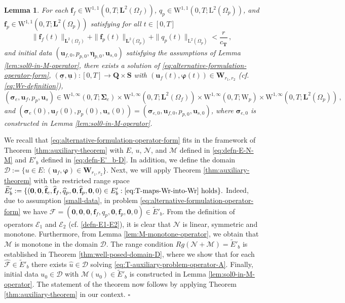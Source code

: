 \documentclass[11pt]{article}
\numberwithin{equation}{section}
\newcommand{\bbeta}{{\boldsymbol\eta}}
\newcommand{\bsi}{{\boldsymbol\sigma}}
\newcommand{\bSigma}{{\boldsymbol\Sigma}}
\newcommand{\bvarphi}{{\boldsymbol\varphi}}
\newcommand{\ubsi}{\underline{\bsi}}
\newcommand{\ubu}{\underline{\bu}}
\newcommand{\f}{\mathbf{f}}
\newcommand{\bu}{\mathbf{u}}
\newcommand{\0}{{\mathbf{0}}}
\def\bW{\mathbf{W}}
\def\bT{\mathbf{T}}
\def\bQ{\mathbf{Q}}
\def\bS{\mathbf{S}}
\newcommand{\bL}{\mathbf{L}}
\newcommand{\cE}{\mathcal{E}}
\newcommand{\cF}{\mathcal{F}}
\newcommand{\cN}{\mathcal{N}}
\newcommand{\cM}{\mathcal{M}}
\newcommand{\cD}{\mathcal{D}}
\def\L{\mathrm{L}}
\def\W{\mathrm{W}}
\def\wt{\widetilde}
\def\wh{\widehat}
\newtheorem{lem}[thm]{Lemma}
\newenvironment{proof}{\noindent{\it Proof.}}{\hfill$\square$}
\numberwithin{equation}{section}
\begin{document}
\begin{lem}\label{lem:parabolic-solution}
For each 
$\f_f\in \W^{1,1}(0,T;\bL^2(\Omega_f))$, $q_p\in \W^{1,1}(0,T;\L^2(\Omega_p))$, and $\f_p\in \W^{1,1}(0,T;\bL^2(\Omega_p))$ satisfying for all $t \in [0,T]$
%
\begin{equation}\label{small-data}
\|\f_f(t)\|_{\bL^2(\Omega_f)} + \|\f_p(t)\|_{\bL^2(\Omega_p)} + \|q_p(t)\|_{\L^2(\Omega_p)} 
< \frac{r}{c_\bT}\,,
\end{equation}
%
and initial data $(\bu_{f,0},p_{p,0},\bbeta_{p,0},\bu_{s,0})$
satisfying the assumptions of Lemma \ref{lem:sol0-in-M-operator}, there exists a solution of \eqref{eq:alternative-formulation-operator-form}, $(\ubsi,\ubu): [0,T] \to \bQ\times\bS$ with $(\bu_f(t),\bvarphi(t))\in \bW_{r_1,r_2}$ (cf. \eqref{eq:Wr-definition}),
%
\begin{equation*}
(\bsi_e, \bu_f, p_p,\bu_s)\in \W^{1,\infty}(0,T;\bSigma_e)\times \W^{1,\infty}(0,T;\bL^2(\Omega_f))\times \W^{1,\infty}(0,T;\W_p)\times\W^{1,\infty}(0,T; \bL^2(\Omega_p))\,,
\end{equation*}
%
and $(\bsi_e(0),\bu_f(0),p_p(0),\bu_s(0)) = (\bsi_{e,0},\bu_{f,0},p_{p,0},\bu_{s,0})$, where $\bsi_{e,0}$ is constructed in Lemma \ref{lem:sol0-in-M-operator}.
\end{lem}
%
\begin{proof}
We recall that \eqref{eq:alternative-formulation-operator-form} fits in the framework of Theorem \ref{thm:auxiliary-theorem} with $E$, $u$, $\cN$, and $\cM$ defined in \eqref{eq:defn-E-N-M} and $E'_b$ defined in \eqref{eq:defn-E'_b-D}. In addition, we define the domain 
%
$
\cD := \{u \in E: (\bu_f,\bvarphi) \in \bW_{r_1,r_2}\}.
$
%
Next, we will apply Theorem \ref{thm:auxiliary-theorem} with the restricted range space 
%
$
\wt{E}'_b := \{(\0,\0,\wh{\f}_e,\wh{\f}_f,\wh{q}_p,\0,\wh{\f}_p,\0,0) \in E'_b: \mbox{\eqref{eq:T-maps-Wr-into-Wr} holds}\}.
$
%
Indeed, due to assumption \eqref{small-data}, in problem \eqref{eq:alternative-formulation-operator-form} we have $\cF = (\0,\0,\0,\f_f,q_p,\0,\f_p,\0,0) \in \wt{E}'_b$. 
From the definition of operators $\cE_1$ and $\cE_2$ (cf. \eqref{defn-E1-E2}), it is clear that $\cN$ is linear, symmetric and monotone. 
Furthermore, from Lemma \ref{lem:M-monotone-operator}, we obtain that $\cM$ is monotone in the domain $\cD$. 
The range condition $Rg(\cN+\cM) = \wt{E}'_b$ is established in Theorem \ref{thm:well-posed-domain-D}, where we show that for each $\wh{\cF} \in \wt{E}'_b$ there exists $\wh{u}\in \cD$ solving \eqref{eq:T-auxiliary-problem-operator-A}. 
Finally, initial data $u_0 \in \cD$ with $\cM(u_0) \in \wt{E}'_b$ is constructed in Lemma \ref{lem:sol0-in-M-operator}. 
The statement of the theorem now follows by applying Theorem \ref{thm:auxiliary-theorem} in our context.
\end{proof}
\end{document}
